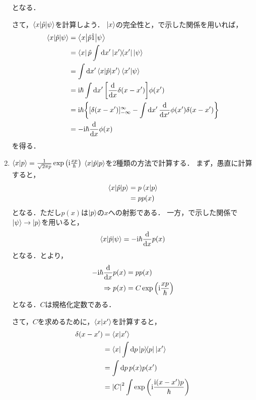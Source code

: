 \documentclass{report}
\begin{document}
\begin{enumerate}
        となる．
        \par
        さて，$\mel**{x}{\hat{p}}{\psi}$を計算しよう．
        $\ket{x}$の完全性と，で示した関係を用いれば，
        \begin{align}
          \mel**{x}{\hat{p}}{\psi} &= \mel**{x}{\hat{p}\hat{1}}{\psi} \\ 
          &= \bra{x}\hat{p}\int\dd{x'}\ketbra{x'}{x'}\ket{\psi} \\ 
          &= \int\dd{x'}\mel**{x}{\hat{p}}{x'}\braket{x'}{\psi} \\ 
          &= \mathrm{i}\hbar\int\dd{x'}\qty[\dv{x}\delta(x - x')]\phi(x') \\ 
          &= \mathrm{i}\hbar\qty{[\delta(x - x')]_{-\infty}^{\infty} - \int\dd{x'}\dv{x'}\phi(x')\delta(x - x')} \\ 
          &= -\mathrm{i}\hbar\dv{x}\phi(x)\label{psix-diff}
        \end{align}
        を得る．
      \item $\braket{x}{p} = \frac{1}{\sqrt{2\pi p}}\exp\qty(\mathrm{i}\frac{xp}{\hbar})$
        $\mel**{x}{\hat{p}}{p}$を2種類の方法で計算する．
        まず，愚直に計算すると，
        \begin{align}
          \mel**{x}{\hat{p}}{p} &= p\braket{x}{p} \\ 
          &= pp(x)\label{xpp-1}
        \end{align}
        となる．ただし$p(x)$は$\ket{p}$の$x$への射影である．
        一方，で示した関係で$\ket{\psi} \to \ket{p}$を用いると，
        \begin{align}
          \mel**{x}{\hat{p}}{\psi} = -\mathrm{i}\hbar\dv{x}p(x)\label{xpp-2}
        \end{align}
        となる．とより，
        \begin{align}
          -\mathrm{i}\hbar\dv{x}p(x) &= pp(x) \\ 
          \Rightarrow p(x) &= C\exp\qty(\mathrm{i}\frac{xp}{\hbar})
        \end{align}
        となる．$C$は規格化定数である．
        \par
        さて，$C$を求めるために，$\braket{x}{x'}$を計算すると，
        \begin{align}
          \delta(x - x') &= \braket{x}{x'} \\ 
          &= \bra{x}\int\dd{p}\ketbra{p}{p}\ket{x'} \\ 
          &= \int\dd{p}p(x)p(x') \\ 
          &= \abs{C}^2\int\exp\qty(\i\frac{\i\qty(x - x')p}{\hbar})

\end{align}
\end{enumerate}
\end{document}
